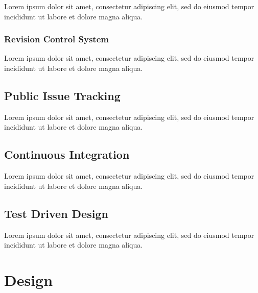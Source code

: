 \documentclass[12pt, a4paper]{article}
\begin{document}
Lorem ipsum dolor sit amet, consectetur adipiscing elit, sed do eiusmod tempor incididunt ut labore et dolore magna aliqua.


\subsubsection{Revision Control System}

Lorem ipsum dolor sit amet, consectetur adipiscing elit, sed do eiusmod tempor incididunt ut labore et dolore magna aliqua.


\subsection{Public Issue Tracking}

Lorem ipsum dolor sit amet, consectetur adipiscing elit, sed do eiusmod tempor incididunt ut labore et dolore magna aliqua.


\subsection{Continuous Integration}

Lorem ipsum dolor sit amet, consectetur adipiscing elit, sed do eiusmod tempor incididunt ut labore et dolore magna aliqua.


\subsection{Test Driven Design}

Lorem ipsum dolor sit amet, consectetur adipiscing elit, sed do eiusmod tempor incididunt ut labore et dolore magna aliqua.


\section{Design}
\end{document}
